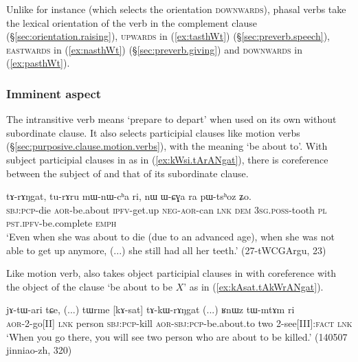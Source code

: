 Unlike  for instance (which selects the orientation \textsc{downwards}), phasal verbs take the lexical orientation of the verb in the complement clause (§\ref{sec:orientation.raising}), \textsc{upwards} in (\ref{ex:tasthWt}) (§\ref{sec:preverb.speech}), \textsc{eastwards} in (\ref{ex:nasthWt}) (§\ref{sec:preverb.giving}) and \textsc{downwards} in (\ref{ex:pasthWt}).

\subsubsection{Imminent aspect} \label{sec:imminent.complements}
The intransitive verb  means `prepare to depart' when used on its own without subordinate clause. It also selects participial clauses like motion verbs (§\ref{sec:purposive.clause.motion.verbs}), with the meaning `be about to'. With subject participial clauses in  as in (\ref{ex:kWsi.tArANgat}), there is coreference between the subject of  and that of its subordinate clause.


\begin{exe}
\ex \label{ex:kWsi.tArANgat}
 \gll [kɯ-si] tɤ-rɤŋgat, tu-rɤru mɯ-nɯ-cʰa ri, { } nɯ ɯ-ɕɣa ra pɯ-tsʰoz ʑo. \\
 \textsc{sbj}:\textsc{pcp}-die \textsc{aor}-be.about \textsc{ipfv}-get.up \textsc{neg}-\textsc{aor}-can \textsc{lnk} {  } \textsc{dem} \textsc{3sg}.\textsc{poss}-tooth \textsc{pl} \textsc{pst}.\textsc{ipfv}-be.complete \textsc{emph} \\
 \glt `Even when she was about to die (due to an advanced age), when she was not able to get up anymore, (...) she still had all her teeth.' (27-tWCGArgu, 23)
\end{exe}

Like motion verb,  also takes object participial clauses in  with coreference with the object of the clause `be about to be $X$' as in (\ref{ex:kAsat.tAkWrANgat}).

\begin{exe}
\ex \label{ex:kAsat.tAkWrANgat}
 \gll jɤ-tɯ-ari tɕe, (...)  tɯrme [kɤ-sat] tɤ-kɯ-rɤŋgat (...) ʁnɯz tɯ-mtɤm ri \\
 \textsc{aor}-2-go[II] \textsc{lnk} {  } person \textsc{sbj}:\textsc{pcp}-kill \textsc{aor}-\textsc{sbj}:\textsc{pcp}-be.about.to {  } two 2-see[III]:\textsc{fact} \textsc{lnk} \\
 \glt `When you go there, you will see two person who are about to be killed.' (140507 jinniao-zh, 320)
\end{exe} 

